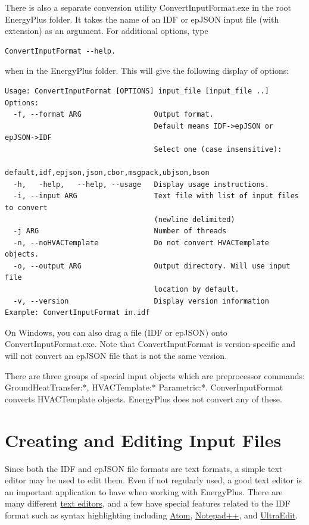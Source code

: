There is also a separate conversion utility ConvertInputFormat.exe in the root EnergyPlus folder.
It takes the name of an IDF or epJSON input file (with extension) as an argument. For additional options,
type 
\begin{verbatim}
ConvertInputFormat --help.
\end{verbatim}
when in the EnergyPlus folder. This will give the following display
of options:
\begin{verbatim}
Usage: ConvertInputFormat [OPTIONS] input_file [input_file ..]
Options:
  -f, --format ARG                 Output format.
                                   Default means IDF->epJSON or epJSON->IDF
                                   Select one (case insensitive):
                                   default,idf,epjson,json,cbor,msgpack,ubjson,bson
  -h,   -help,   --help, --usage   Display usage instructions.
  -i, --input ARG                  Text file with list of input files to convert
                                   (newline delimited)
  -j ARG                           Number of threads
  -n, --noHVACTemplate             Do not convert HVACTemplate objects.
  -o, --output ARG                 Output directory. Will use input file
                                   location by default.
  -v, --version                    Display version information
Example: ConvertInputFormat in.idf
\end{verbatim}

On Windows, you can also drag a file (IDF or epJSON) onto ConvertInputFormat.exe.
Note that ConvertInputFormat is version-specific and will not convert an epJSON file that is not the same version.

There are three groups of special input objects which are preprocessor commands: GroundHeatTransfer:*,
HVACTemplate:* Parametric:*. ConverInputFormat converts HVACTemplate objects.  EnergyPlus does not convert any of these.


\section{Creating and Editing Input Files}

Since both the IDF and epJSON file formats are text formats, a simple
text editor may be used to edit them. Even if not regularly used,
a good text editor is an important application to have when working
with EnergyPlus. There are many different \href{https://en.wikipedia.org/wiki/Comparison_of_text_editors}{text editors},
and a few have special features related to the IDF format such as
syntax highlighting including \href{https://github.com/bigladder/atom-language-energyplus}{Atom},
\href{https://github.com/jmarrec/notepad}{Notepad++}, and \href{https://energyplushelp.freshdesk.com/}{UltraEdit}.

